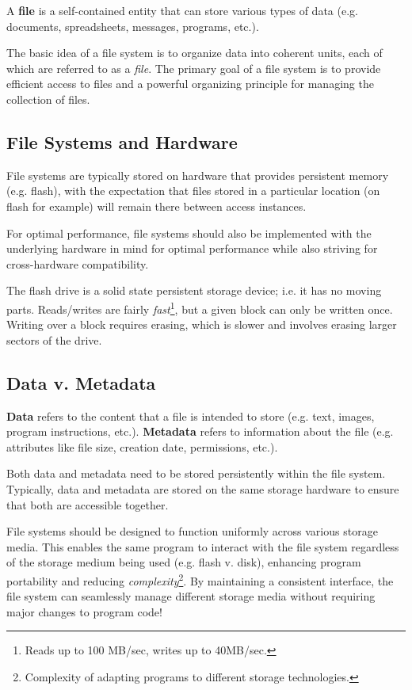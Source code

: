 \documentclass{report}
\newcommand{\definitionBegin}[1]{\begin{tcolorbox}[title={Definition: #1}]}
\newcommand{\definitionEnd}{\end{tcolorbox}}
\newcommand{\exampleBegin}[1]{\begin{tcolorbox}[colback=blue!5!white,colframe=black!75!blue,title={Example:
      #1}]}
\newcommand{\exampleEnd}{\end{tcolorbox}}
\newcommand{\asideBegin}[1]{\begin{tcolorbox}[colback=orange!5!white,colframe=black!75!orange,title={Aside:
      #1}]}
\newcommand{\asideEnd}{\end{tcolorbox}}
\begin{document}
\definitionBegin{File}
A \textbf{file} is a self-contained entity that can store various types of data (e.g. documents,
spreadsheets, messages, programs, etc.).
\definitionEnd

The basic idea of a file system is to organize data into coherent units, each of which are referred
to as a \textit{file}. The primary goal of a file system is to provide efficient access to files and
a powerful organizing principle for managing the collection of files.


\subsection{File Systems and Hardware}
File systems are typically stored on hardware that provides persistent memory (e.g. flash), with the
expectation that files stored in a particular location (on flash for example) will remain there
between access instances.

For optimal performance, file systems should also be implemented with the underlying hardware in
mind for optimal performance while also striving for cross-hardware compatibility.

\exampleBegin{Flash Drives}
The flash drive is a solid state persistent storage device; i.e. it has no moving
parts. Reads/writes are fairly \textit{fast}\footnote{Reads up to 100 MB/sec, writes up to
  40MB/sec.}, but a given block can only be written once. Writing over a block requires erasing,
which is slower and involves erasing larger sectors of the drive.
\exampleEnd


\subsection{Data v. Metadata}
\definitionBegin{Data and Metadata}
\textbf{Data} refers to the content that a file is intended to store (e.g. text, images, program
instructions, etc.).
\tcblower
\textbf{Metadata} refers to information about the file (e.g. attributes like file size, creation
date, permissions, etc.).
\definitionEnd

Both data and metadata need to be stored persistently within the file system. Typically, data and
metadata are stored on the same storage hardware to ensure that both are accessible together.

\asideBegin{Uniform Functionality}
File systems should be designed to function uniformly across various storage media. This enables the
same program to interact with the file system regardless of the storage medium being used
(e.g. flash v. disk), enhancing program portability and reducing
\textit{complexity}\footnote{Complexity of adapting programs to different storage technologies.}. By
maintaining a consistent interface, the file system can seamlessly manage different storage media
without requiring major changes to program code!
\asideEnd
\end{document}
